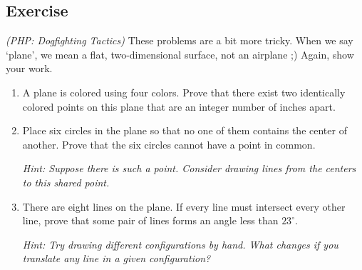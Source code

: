 \documentclass{article}
\newcounter{counter}
\newcommand{\Exercise}{Exercise \stepcounter{counter}\thecounter}
\begin{document}
\subsection*{\Exercise}
    \textit{(PHP: Dogfighting Tactics) } These problems are a bit more tricky. When we say `plane', we mean a flat, two-dimensional surface, not an airplane ;) Again, show your work.
    \begin{enumerate}
        \item A plane is colored using four colors. Prove that there exist two identically colored points on this plane that are an integer number of inches apart. %
        \item Place six circles in the plane so that no one of them contains the center of another. Prove that the six circles cannot have a point in common.
        
        \vspace{1mm} \textit{Hint: Suppose there is such a point. Consider drawing lines from the centers to this shared point.}
        \item There are eight lines on the plane. If every line must intersect every other line, prove that some pair of lines forms an angle less than $23^{\circ}$.
        
        \vspace{1mm} \textit{Hint: Try drawing different configurations by hand. What changes if you translate any line in a given configuration?}
    \end{enumerate}
\end{document}
